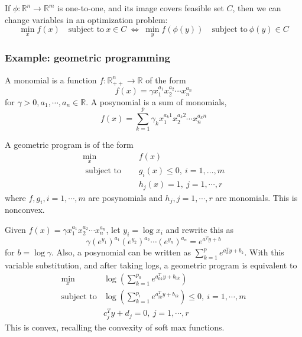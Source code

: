 \documentclass[a4paper]{article}
\begin{document}
{\noindent If $\phi : \mathbb{R}^n \rightarrow \mathbb{R}^m$ is one-to-one, and its image covers feasible set $C$, then we can change variables in an optimization problem:
\begin{equation}
  \min_x f(x) \quad \text{subject to} \ x \in C \ \Longleftrightarrow \ \min_y f(\phi(y)) \quad \text{subject to} \ \phi(y) \in C \nonumber
\end{equation}

\subsubsection{Example: geometric programming}
A monomial is a function $f : \mathbb{R}^n_{++} \rightarrow \mathbb{R}$ of the form
\begin{equation}
  f(x) = \gamma x_1^{a_1}x_2^{a_2}\cdots x_n^{a_n} \nonumber
\end{equation}
for $\gamma > 0, a_1, \cdots, a_n \in \mathbb{R}$. A posynomial is a sum of monomials,
\begin{equation}
  f(x) = \sum_{k=1}^{p}\gamma_k x_1^{a_k1}x_2^{a_k2}\cdots x_n^{a_kn} \nonumber
\end{equation}

\noindent A geometric program is of the form
\begin{equation}
  \begin{array}{ll}
    \min\limits_{x} & \quad f(x)  \\
    \text { subject to } &\quad g_{i}(x)\leq 0, \ i=1, \ldots, m \\ \nonumber
    & \quad h_j(x) = 1, \ j = 1, \cdots, r
\end{array}
\end{equation}
where $f, g_i, i = 1, \cdots, m$ are posynomials and $h_j, j = 1,\cdots, r$ are monomials. This is nonconvex.

\noindent Given $f(x) = \gamma x_1^{a_1}x_2^{a_2}\cdots x_n^{a_n}$, let $y_i = \log x_i$ and rewrite this as 
\begin{equation}
  \gamma (e^{y_1})^{a_1} (e^{y_2})^{a_2}  \cdots (e^{y_n})^{a_n} = e^{a^T y + b} \nonumber 
\end{equation}
for $ b = \log \gamma$. Also, a posynomial can be written as $\sum_{k=1}^p e^{a_k^T y + b_k}$. With this variable substitution, and after taking logs, a geometric program is equivalent to
\begin{equation}
  \begin{array}{ll}
  \min\limits_x  & \log(\sum\limits_{k=1}^{p_0} e^{a_{0k}^T y + b_{0k}}) \\
  \text{subject to}  &  \log(\sum\limits_{k=1}^{p_i} e^{a_{ik}^T y + b_{ik}}) \leq 0, \ i = 1, \cdots, m \\ \nonumber
  & c_j^T y + d_j = 0, \ j = 1, \cdots, r
\end{array}
\end{equation} 
This is convex, recalling the convexity of soft max functions.

}
\end{document}
